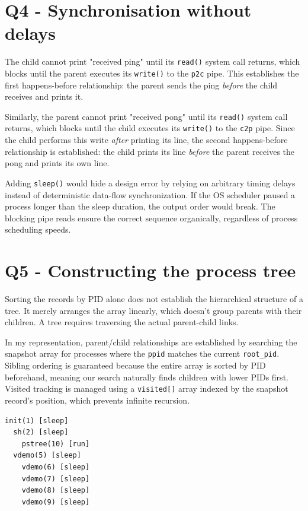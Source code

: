 \documentclass[11pt,a4paper]{article}
\begin{document}
\section*{Q4 - Synchronisation without delays}
The child cannot print "received ping" until its \texttt{read()} system call returns, which blocks until the parent executes its \texttt{write()} to the \texttt{p2c} pipe. This establishes the first happens-before relationship: the parent sends the ping \textit{before} the child receives and prints it. 

Similarly, the parent cannot print "received pong" until its \texttt{read()} system call returns, which blocks until the child executes its \texttt{write()} to the \texttt{c2p} pipe. Since the child performs this write \textit{after} printing its line, the second happens-before relationship is established: the child prints its line \textit{before} the parent receives the pong and prints its own line.

Adding \texttt{sleep()} would hide a design error by relying on arbitrary timing delays instead of deterministic data-flow synchronization. If the OS scheduler paused a process longer than the sleep duration, the output order would break. The blocking pipe reads ensure the correct sequence organically, regardless of process scheduling speeds.

\section*{Q5 - Constructing the process tree}
Sorting the records by PID alone does not establish the hierarchical structure of a tree. It merely arranges the array linearly, which doesn't group parents with their children. A tree requires traversing the actual parent-child links. 

In my representation, parent/child relationships are established by searching the snapshot array for processes where the \texttt{ppid} matches the current \texttt{root\_pid}. Sibling ordering is guaranteed because the entire array is sorted by PID beforehand, meaning our search naturally finds children with lower PIDs first. Visited tracking is managed using a \texttt{visited[]} array indexed by the snapshot record's position, which prevents infinite recursion.

\begin{lstlisting}
init(1) [sleep]
  sh(2) [sleep]
    pstree(10) [run]
  vdemo(5) [sleep]
    vdemo(6) [sleep]
    vdemo(7) [sleep]
    vdemo(8) [sleep]
    vdemo(9) [sleep]
\end{lstlisting}
\end{document}
